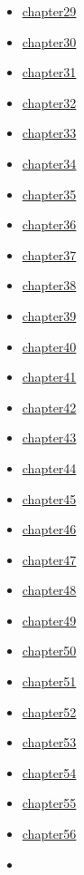 \documentclass[
]{article}
\begin{document}
\begin{itemize}
\begin{itemize}
  \item
    \href{benjamin13.2-3-50.md}{chapter29}
  \item
    \href{benjamin13.2-3-56.md}{chapter30}
  \item
    \href{benjamin13.2-3-57.md}{chapter31}
  \item
    \href{benjamin13.2-3-58.md}{chapter32}
  \item
    \href{benjamin13.2-3-59.md}{chapter33}
  \item
    \href{benjamin13.2-3-60.md}{chapter34}
  \item
    \href{benjamin13.2-3-63.md}{chapter35}
  \item
    \href{benjamin13.2-3-64.md}{chapter36}
  \item
    \href{benjamin13.2-3-65.md}{chapter37}
  \item
    \href{benjamin13.2-3-66.md}{chapter38}
  \item
    \href{benjamin13.2-3-70.md}{chapter39}
  \item
    \href{benjamin13.2-3-72.md}{chapter40}
  \item
    \href{benjamin13.2-3-73.md}{chapter41}
  \item
    \href{benjamin13.2-3-75.md}{chapter42}
  \item
    \href{benjamin13.2-3-79.md}{chapter43}
  \item
    \href{benjamin13.2-3-80.md}{chapter44}
  \item
    \href{benjamin13.2-3-82.md}{chapter45}
  \item
    \href{benjamin13.2-3-83.md}{chapter46}
  \item
    \href{benjamin13.2-3-84.md}{chapter47}
  \item
    \href{benjamin13.2-3-85.md}{chapter48}
  \item
    \href{benjamin13.2-3-91.md}{chapter49}
  \item
    \href{benjamin13.2-3-98.md}{chapter50}
  \item
    \href{benjamin13.2-3-100.md}{chapter51}
  \item
    \href{benjamin13.2-3-102.md}{chapter52}
  \item
    \href{benjamin13.2-3-103.md}{chapter53}
  \item
    \href{benjamin13.2-3-104.md}{chapter54}
  \item
    \href{benjamin13.2-3-105.md}{chapter55}
  \item
    \href{benjamin13.2-3-108.md}{chapter56}
  \item

\end{itemize}
\end{itemize}
\end{document}
